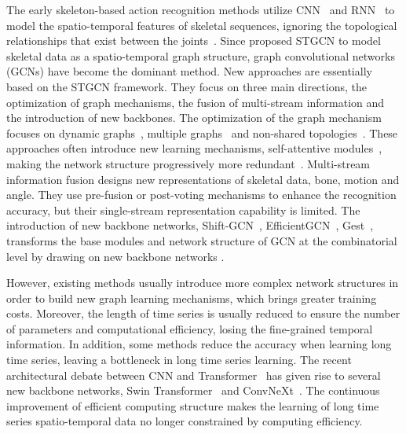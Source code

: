 \documentclass[10pt,twocolumn,letterpaper]{article}
\begin{document}
The early skeleton-based action recognition methods utilize CNN~\cite{li2017skeleton} and RNN~\cite{du2015hierarchical} to model the spatio-temporal features of skeletal sequences, ignoring the topological relationships that exist between the joints~\cite{chen2021channel}. Since \cite{li2019actional} proposed STGCN to model skeletal data as a spatio-temporal graph structure, graph convolutional networks (GCNs) have become the dominant method. New approaches are essentially based on the STGCN framework. They focus on three main directions, the optimization of graph mechanisms, the fusion of multi-stream information and the introduction of new backbones. The optimization of the graph mechanism focuses on dynamic graphs~\cite{shi2019two,zhang2020semantics,obinata2021temporal,zeng2021learning}, multiple graphs~\cite{huang2020spatio,liu2020disentangling,ye2020dynamic} and non-shared topologies~\cite{cheng2020decoupling,chen2021channel}. These approaches often introduce new learning mechanisms, \eg self-attentive modules~\cite{ ye2020dynamic, chen2021channel}, making the network structure progressively more redundant~\cite{song2022constructing}. Multi-stream information fusion designs new representations of skeletal data, \eg bone, motion and angle. They use pre-fusion or post-voting mechanisms to enhance the recognition accuracy, but their single-stream representation capability is limited. The introduction of new backbone networks, \eg Shift-GCN~\cite{cheng2020skeleton}, EfficientGCN~\cite{song2022constructing}, Gest~\cite{bai2021gcst}, transforms the base modules and network structure of GCN at the combinatorial level by drawing on new backbone networks \cite{gudovskiy2017shiftcnn,tan2019efficientnet,vaswani2017attention}.

However, existing methods usually introduce more complex network structures in order to build new graph learning mechanisms, which brings greater training costs. Moreover, the length of time series is usually reduced to ensure the number of parameters and computational efficiency, losing the fine-grained temporal information. In addition, some methods reduce the accuracy when learning long time series, leaving a bottleneck in long time series learning. The recent architectural debate between CNN and Transformer~\cite{vaswani2017attention} has given rise to several new backbone networks, \eg Swin Transformer~\cite{liu2021swin} and ConvNeXt~\cite{liu2022convnet}. The continuous improvement of efficient computing structure makes the learning of long time series spatio-temporal data no longer constrained by computing efficiency.
\end{document}
